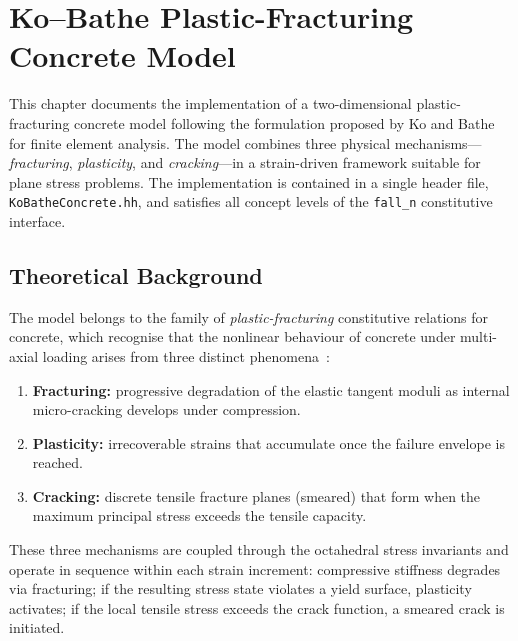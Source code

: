
\chapter{Ko--Bathe Plastic-Fracturing Concrete Model}
\label{ch:ko-bathe-concrete}

This chapter documents the implementation of a two-dimensional plastic-fracturing
concrete model following the formulation proposed by Ko and
Bathe~\cite{KoBathe2026} for finite element analysis.  The model combines
three physical mechanisms---\emph{fracturing}, \emph{plasticity}, and
\emph{cracking}---in a strain-driven framework suitable for plane stress
problems.  The implementation is contained in a single header file,
\texttt{KoBatheConcrete.hh}, and satisfies all concept levels of the
\texttt{fall\_n} constitutive interface.

\section{Theoretical Background}
\label{sec:kb-theory}

The model belongs to the family of \emph{plastic-fracturing} constitutive
relations for concrete, which recognise that the nonlinear behaviour of
concrete under multi-axial loading arises from three distinct phenomena~\cite{KoBathe2026,BatheRamaswamy1979}:

\begin{enumerate}[label=(\roman*)]
  \item \textbf{Fracturing:} progressive degradation of the elastic tangent
        moduli as internal micro-cracking develops under compression.
  \item \textbf{Plasticity:} irrecoverable strains that accumulate once the
        failure envelope is reached.
  \item \textbf{Cracking:} discrete tensile fracture planes (smeared) that
        form when the maximum principal stress exceeds the tensile capacity.
\end{enumerate}

These three mechanisms are coupled through the octahedral stress invariants
and operate in sequence within each strain increment: compressive stiffness
degrades via fracturing; if the resulting stress state violates a yield
surface, plasticity activates; if the local tensile stress exceeds the crack
function, a smeared crack is initiated.

